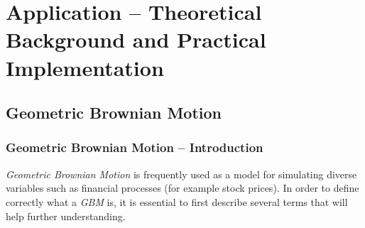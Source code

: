 \chapter{Application -- Theoretical Background and Practical Implementation}

\section{Geometric Brownian Motion}
        
    \subsection{Geometric Brownian Motion -- Introduction}
        \textit{Geometric Brownian Motion} is frequently used as a model for simulating diverse variables such as financial processes (for example stock prices). In order to define correctly what a \textit{GBM} is, it is essential to first describe several terms that will help further understanding.
    
